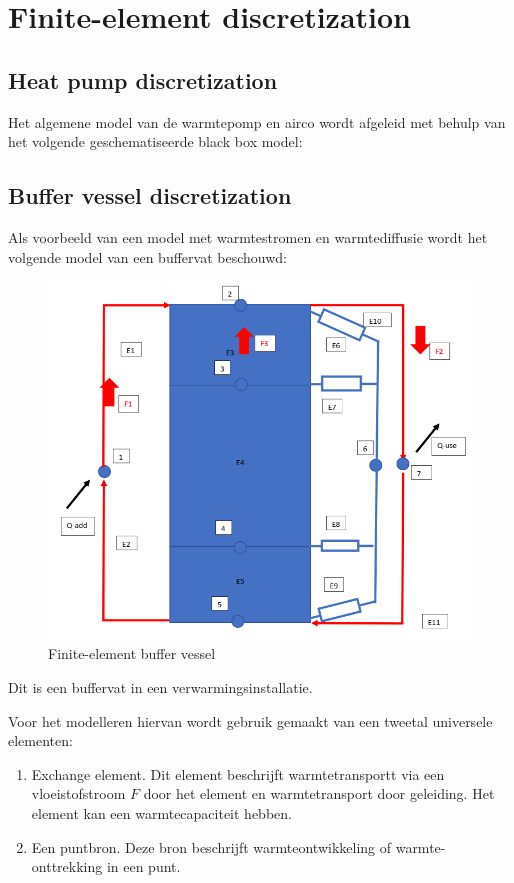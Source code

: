 \section{Finite-element discretization}

\subsection{Heat pump discretization}

Het algemene model van de warmtepomp en airco wordt afgeleid met behulp van het volgende geschematiseerde black box model:

\subsection{Buffer vessel discretization}

Als voorbeeld van een model met warmtestromen en warmtediffusie wordt het volgende model van
een buffervat beschouwd:

\begin{figure}[H]
	\centering
	\includegraphics[width=0.7\columnwidth]{Figures/FEwatervat.png}
	\caption[Short title]{Finite-element buffer vessel}
	\label{fig:FEbuffervessel}
\end{figure}

Dit is een buffervat in een verwarmingsinstallatie.

Voor het modelleren hiervan wordt gebruik gemaakt van een tweetal universele elementen:

\begin{enumerate}
	\item Exchange element. Dit element beschrijft warmtetransportt via een vloeistofstroom $F$ door het element en warmtetransport door geleiding. Het element kan een warmtecapaciteit
	hebben.
	\item Een puntbron. Deze bron beschrijft warmteontwikkeling of warmte-onttrekking in een punt.
\end{enumerate}

